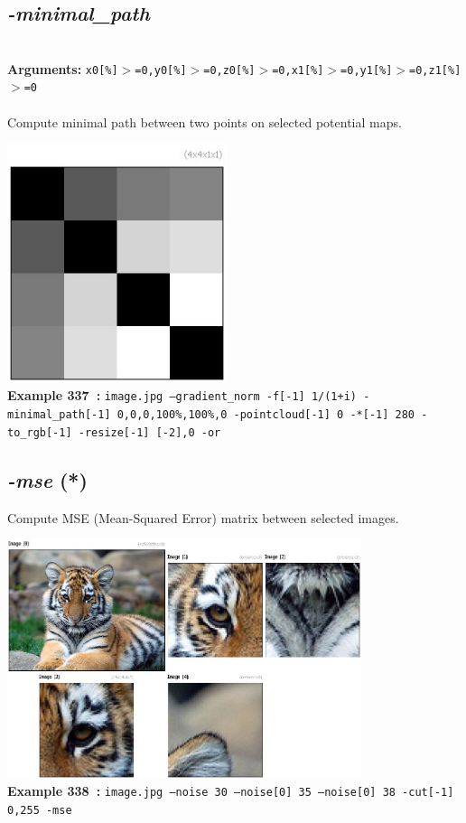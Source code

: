 \documentclass[a4paper,11pt,twoside]{book}
\begin{document}
\subsection{\emph{-minimal\_path} }\vspace*{-0.5em}
~\\\textbf{Arguments: } 
{\small \texttt{x0[\%]$>$=0,y0[\%]$>$=0,z0[\%]$>$=0,x1[\%]$>$=0,y1[\%]$>$=0,z1[\%]$>$=0}}\\~\\
Compute minimal path between two points on selected potential maps.
\begin{center}\includegraphics[keepaspectratio=true,height=7cm,width=\textwidth]{img/gmic_def337.jpg}\\
{\footnotesize \textbf{Example 337~:} \texttt{image.jpg --gradient\_norm -f[-1] 1/(1+i) -minimal\_path[-1] 0,0,0,100\%,100\%,0 -pointcloud[-1] 0 -*[-1] 280 -to\_rgb[-1] -resize[-1] [-2],0 -or}}
\end{center}

\subsection{\emph{-mse} (*)}\vspace*{-0.5em}
Compute MSE (Mean-Squared Error) matrix between selected images.
\begin{center}\includegraphics[keepaspectratio=true,height=7cm,width=\textwidth]{img/gmic_def338.jpg}\\
{\footnotesize \textbf{Example 338~:} \texttt{image.jpg --noise 30 --noise[0] 35 --noise[0] 38 -cut[-1] 0,255 -mse}}
\end{center}
\end{document}
